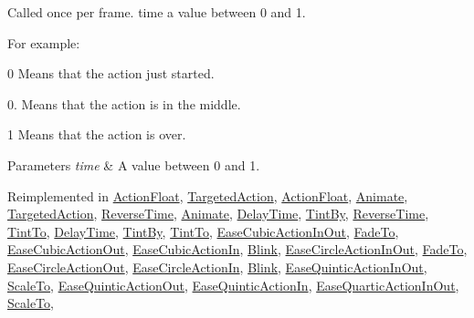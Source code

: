 Called once per frame. time a value between 0 and 1.

For example\+:
\begin{DoxyItemize}
\item 0 Means that the action just started.
\item 0. Means that the action is in the middle.
\item 1 Means that the action is over.
\end{DoxyItemize}


\begin{DoxyParams}{Parameters}
{\em time} & A value between 0 and 1. \\
\hline
\end{DoxyParams}


Reimplemented in \hyperlink{classActionFloat_a0b6b333b5524a617f3088b2c1893b55c}{Action\+Float}, \hyperlink{classTargetedAction_a95ad5a7c4384449e147f0200d1c4b84b}{Targeted\+Action}, \hyperlink{classActionFloat_a0b6b333b5524a617f3088b2c1893b55c}{Action\+Float}, \hyperlink{classAnimate_a643f933a12b158eb94d1aaa2d8eff13f}{Animate}, \hyperlink{classTargetedAction_a031468e095f1c4693a5e265664f7c337}{Targeted\+Action}, \hyperlink{classReverseTime_a362f5b46a1b2e1a9b2ce8a59df1dca97}{Reverse\+Time}, \hyperlink{classAnimate_ae86fbd3249e9272b1d35d7256d6bcfd6}{Animate}, \hyperlink{classDelayTime_abff66697a3fa8d997d5ae190ec7f6a8e}{Delay\+Time}, \hyperlink{classTintBy_aabf7d54981877b1e78b6bbd4cc046b5f}{Tint\+By}, \hyperlink{classReverseTime_a7a321c5c5d148b4e9d718ba67c974297}{Reverse\+Time}, \hyperlink{classTintTo_a1808cd2d0f0e838614c641374856948b}{Tint\+To}, \hyperlink{classDelayTime_a95c80d348c1803a2cb832a3d0e246c5e}{Delay\+Time}, \hyperlink{classTintBy_af8e773a8164eed5d22d3ff801d5f6569}{Tint\+By}, \hyperlink{classTintTo_a09ec73412f7343b89a0a86ca560a1383}{Tint\+To}, \hyperlink{classEaseCubicActionInOut_a533edabe94657e779ad4e4c6d6d1782f}{Ease\+Cubic\+Action\+In\+Out}, \hyperlink{classFadeTo_a677de8611ab23718408f8da3fe9121dc}{Fade\+To}, \hyperlink{classEaseCubicActionOut_a2bebf38d7167886e1ae4643b92e05d72}{Ease\+Cubic\+Action\+Out}, \hyperlink{classEaseCubicActionIn_a245bc3028244567a11dbe02bc2e11a10}{Ease\+Cubic\+Action\+In}, \hyperlink{classBlink_aa9e0a219061963eecfa5b8193f2780f2}{Blink}, \hyperlink{classEaseCircleActionInOut_a6a9cb49f30bc664ab65a067ce48b506e}{Ease\+Circle\+Action\+In\+Out}, \hyperlink{classFadeTo_a1ce1e954d444943c1ec9923f14b3c599}{Fade\+To}, \hyperlink{classEaseCircleActionOut_a48e4c603a5dd0eb56f289dd2ffd8d26b}{Ease\+Circle\+Action\+Out}, \hyperlink{classEaseCircleActionIn_a8d48762a47eb738ca2b8fb644182e91b}{Ease\+Circle\+Action\+In}, \hyperlink{classBlink_a20ce5c25af940fe152d600a20b183f84}{Blink}, \hyperlink{classEaseQuinticActionInOut_ada59f8dcd6ba1daeaa1fb9d5b1087521}{Ease\+Quintic\+Action\+In\+Out}, \hyperlink{classScaleTo_ad02fb28920bffb05ba31ed1b92c70ef9}{Scale\+To}, \hyperlink{classEaseQuinticActionOut_ab78421446d94c0d0ded5329ed9a3716d}{Ease\+Quintic\+Action\+Out}, \hyperlink{classEaseQuinticActionIn_a168f914597d873e6071d39118f2cf9f5}{Ease\+Quintic\+Action\+In}, \hyperlink{classEaseQuarticActionInOut_a331f286f05a385660f6bff75d5665178}{Ease\+Quartic\+Action\+In\+Out}, \hyperlink{classScaleTo_ac3678e85987891e4cc2e9d612569541c}{Scale\+To}, 